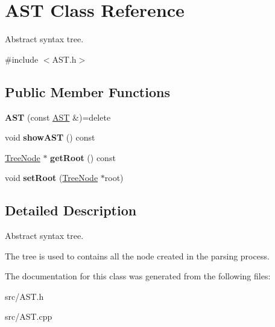 \hypertarget{class_a_s_t}{}\section{A\+ST Class Reference}
\label{class_a_s_t}


Abstract syntax tree.  




{\ttfamily \#include $<$A\+S\+T.\+h$>$}

\subsection*{Public Member Functions}
\begin{DoxyCompactItemize}
\item 
\hypertarget{class_a_s_t_a95385b2e90b7b4a7b407e08b74dc3b62}{}\label{class_a_s_t_a95385b2e90b7b4a7b407e08b74dc3b62} 
{\bfseries A\+ST} (const \hyperlink{class_a_s_t}{A\+ST} \&)=delete
\item 
\hypertarget{class_a_s_t_a1e7a9615a7102784cc601c946c94e9fa}{}\label{class_a_s_t_a1e7a9615a7102784cc601c946c94e9fa} 
void {\bfseries show\+A\+ST} () const
\item 
\hypertarget{class_a_s_t_a1aa227f44b3c10ff256bd070e703d98d}{}\label{class_a_s_t_a1aa227f44b3c10ff256bd070e703d98d} 
\hyperlink{class_tree_node}{Tree\+Node} $\ast$ {\bfseries get\+Root} () const
\item 
\hypertarget{class_a_s_t_ac8fd5d6840a058113abe737fa7eca302}{}\label{class_a_s_t_ac8fd5d6840a058113abe737fa7eca302} 
void {\bfseries set\+Root} (\hyperlink{class_tree_node}{Tree\+Node} $\ast$root)
\end{DoxyCompactItemize}


\subsection{Detailed Description}
Abstract syntax tree. 

The tree is used to contains all the node created in the parsing process. 

The documentation for this class was generated from the following files\+:\begin{DoxyCompactItemize}
\item 
src/A\+S\+T.\+h\item 
src/A\+S\+T.\+cpp\end{DoxyCompactItemize}
